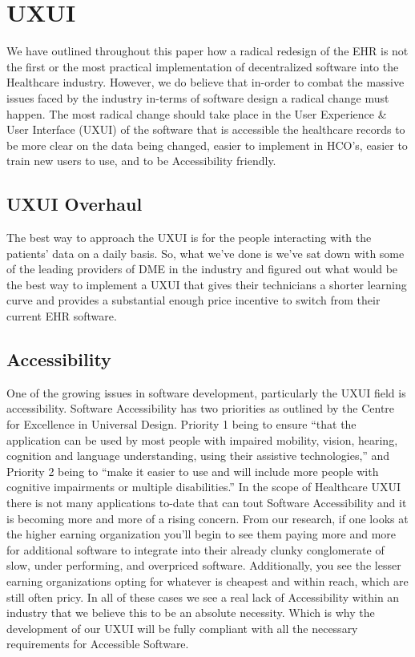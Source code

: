 \documentclass[letterpaper]{article}
\begin{document}
\section{UXUI}
We have outlined throughout this paper how a radical redesign of the EHR is not the first or the most practical implementation of decentralized software into the Healthcare industry. However, we do believe that in-order to combat the massive issues faced by the industry in-terms of software design a radical change must happen. The most radical change should take place in the User Experience & User Interface (UXUI) of the software that is accessible the healthcare records to be more clear on the data being changed, easier to implement in HCO’s, easier to train new users to use, and to be Accessibility friendly.
%
\subsection{UXUI Overhaul}
The best way to approach the UXUI is for the people interacting with the patients' data on a daily basis. So, what we’ve done is we’ve sat down with some of the leading providers of DME in the industry and figured out what would be the best way to implement a UXUI that gives their technicians a shorter learning curve and provides a substantial enough price incentive to switch from their current EHR software.
%
\subsection{Accessibility}
One of the growing issues in software development, particularly the UXUI field is accessibility. Software Accessibility has two priorities as outlined by the Centre for Excellence in Universal Design. Priority 1 being to ensure “that the application can be used by most people with impaired mobility, vision, hearing, cognition and language understanding, using their assistive technologies,” and Priority 2 being to “make it easier to use and will include more people with cognitive impairments or multiple disabilities.” In the scope of Healthcare UXUI there is not many applications to-date that can tout Software Accessibility and it is becoming more and more of a rising concern. From our research, if one looks at the higher earning organization you’ll begin to see them paying more and more for additional software to integrate into their already clunky conglomerate of slow, under performing, and overpriced software. Additionally, you see the lesser earning organizations opting for whatever is cheapest and within reach, which are still often pricy. In all of these cases we see a real lack of Accessibility within an industry that we believe this to be an absolute necessity. Which is why the development of our UXUI will be fully compliant with all the necessary requirements for Accessible Software.
%
\end{document}

